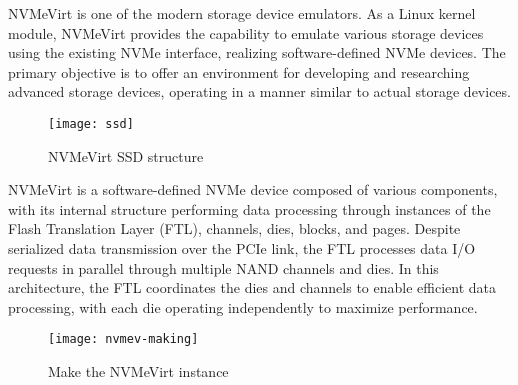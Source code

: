 
NVMeVirt is one of the modern storage device emulators.
As a Linux kernel module, NVMeVirt provides the capability to emulate various storage devices using the existing NVMe interface, realizing software-defined NVMe devices.
The primary objective is to offer an environment for developing and researching advanced storage devices, operating in a manner similar to actual storage devices.

\begin{figure}[t]
    \centering
    \texttt{[image: ssd]}
    \caption{NVMeVirt SSD structure}
    \label{fig:structure}
\end{figure}


NVMeVirt is a software-defined NVMe device composed of various components, with its internal structure performing data processing through instances of the Flash Translation Layer (FTL), channels, dies, blocks, and pages.
Despite serialized data transmission over the PCIe link, the FTL processes data I/O requests in parallel through multiple NAND channels and dies.
In this architecture, the FTL coordinates the dies and channels to enable efficient data processing, with each die operating independently to maximize performance.

\begin{figure}[t]
    \centering
    \texttt{[image: nvmev-making]}
    \caption{Make the NVMeVirt instance}
    \label{fig:making}
\end{figure}


